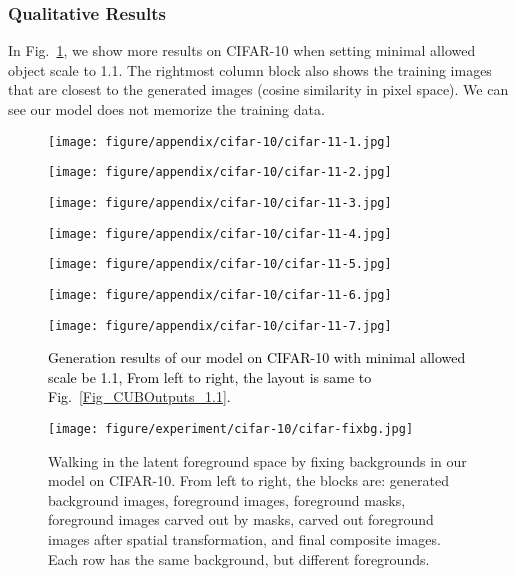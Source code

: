 \documentclass{article} \usepackage{iclr2017_conference,times}
\begin{document}
\subsubsection{Qualitative Results}
In Fig.~\ref{Fig_CIFAROutputs_1.1}, we show more results on CIFAR-10 when setting minimal allowed object scale to 1.1. The rightmost column block also shows the training images that are closest to the generated images (cosine similarity in pixel space). We can see our model does not memorize the training data.

\begin{figure}[h]
\begin{minipage}{0.138\linewidth}
\center
\texttt{[image: figure/appendix/cifar-10/cifar-11-1.jpg]}
\end{minipage}
\begin{minipage}{0.138\linewidth}
\center
\texttt{[image: figure/appendix/cifar-10/cifar-11-2.jpg]}
\end{minipage}
\begin{minipage}{0.138\linewidth}
\center
\texttt{[image: figure/appendix/cifar-10/cifar-11-3.jpg]}
\end{minipage}
\begin{minipage}{0.138\linewidth}
\center
\texttt{[image: figure/appendix/cifar-10/cifar-11-4.jpg]}
\end{minipage}
\begin{minipage}{0.138\linewidth}
\center
\texttt{[image: figure/appendix/cifar-10/cifar-11-5.jpg]}
\end{minipage}
\begin{minipage}{0.138\linewidth}
\center
\texttt{[image: figure/appendix/cifar-10/cifar-11-6.jpg]}
\end{minipage}
\begin{minipage}{0.138\linewidth}
\center
\texttt{[image: figure/appendix/cifar-10/cifar-11-7.jpg]}
\end{minipage}
\caption{\textcolor{black}{Generation results of our model on CIFAR-10 with minimal allowed scale be 1.1, From left to right, the layout is same to Fig.~\ref{Fig_CUBOutputs_1.1}.}}
\label{Fig_CIFAROutputs_1.1}
\end{figure}

\begin{figure}[t]
\begin{minipage}{1\linewidth}
\center
\texttt{[image: figure/experiment/cifar-10/cifar-fixbg.jpg]}
\end{minipage}
\caption{Walking in the latent foreground space by fixing backgrounds in our model on CIFAR-10. From left to right, the blocks are: generated background images, foreground images, foreground masks, foreground images carved out by masks, carved out foreground images after spatial transformation, and final composite images. Each row has the same background, but different foregrounds.}
\label{Fig_CIFAROutputs_fixbg}
\end{figure} 
\end{document}
